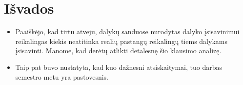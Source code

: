 \chapter{Išvados}

\begin{itemize}
  \item Paaiškėjo, kad tirtu atveju, dalykų sanduose nurodytas dalyko
    įsisavinimui reikalingas kiekis neatitinka realių pastangų reikalingų
    tiems dalykams įsisavinti. Manome, kad derėtų atlikti detalesnę
    šio klausimo analizę.
  \item Taip pat buvo nustatyta, kad kuo dažnesni atsiskaitymai, tuo
    darbas semestro metu yra pastovesnis.
\end{itemize}

